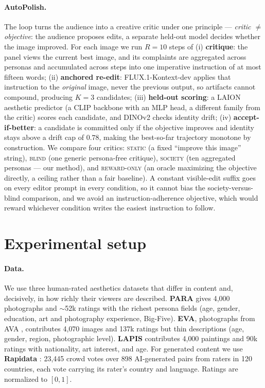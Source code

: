 \documentclass{article}
\begin{document}
\paragraph{AutoPolish.} The loop turns the audience into a creative critic under one principle --- \emph{critic $\neq$ objective}: the audience proposes edits, a separate held-out model decides whether the image improved. For each image we run $R=10$ steps of (i) \textbf{critique}: the panel views the current best image, and its complaints are aggregated across personas and accumulated across steps into one imperative instruction of at most fifteen words; (ii) \textbf{anchored re-edit}: FLUX.1-Kontext-dev \citep{flux2024} applies that instruction to the \emph{original} image, never the previous output, so artifacts cannot compound, producing $K=3$ candidates; (iii) \textbf{held-out scoring}: a LAION aesthetic predictor \citep{schuhmann2022} (a CLIP \citep{radford2021} backbone with an MLP head, a different family from the critic) scores each candidate, and DINOv2 \citep{oquab2023} checks identity drift; (iv) \textbf{accept-if-better}: a candidate is committed only if the objective improves and identity stays above a drift cap of $0.78$, making the best-so-far trajectory monotone by construction. We compare four critics: \textsc{static} (a fixed ``improve this image'' string), \textsc{blind} (one generic persona-free critique), \textsc{society} (ten aggregated personas --- our method), and \textsc{reward-only} (an oracle maximizing the objective directly, a ceiling rather than a fair baseline). A constant visible-edit suffix goes on every editor prompt in every condition, so it cannot bias the society-versus-blind comparison, and we avoid an instruction-adherence objective, which would reward whichever condition writes the easiest instruction to follow.


\section{Experimental setup}

\paragraph{Data.} We use three human-rated aesthetics datasets that differ in content and, decisively, in how richly their viewers are described. \textbf{PARA} \citep{yang2022para} gives 4{,}000 photographs and $\sim$52k ratings with the richest persona fields (age, gender, education, art and photography experience, Big-Five). \textbf{EVA}, photographs from AVA \citep{murray2012ava}, contributes 4{,}070 images and 137k ratings but thin descriptions (age, gender, region, photographic level). \textbf{LAPIS} contributes 4{,}000 paintings and 90k ratings with nationality, art interest, and age. For generated content we use \textbf{Rapidata} \citep{rapidata2024}: 23{,}445 crowd votes over 898 AI-generated pairs from raters in 120 countries, each vote carrying its rater's country and language. Ratings are normalized to $[0,1]$.
\end{document}
